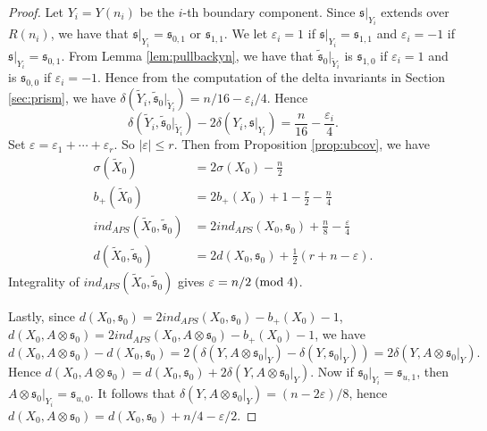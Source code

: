 \documentclass{amsart}
\theoremstyle{definition}
\theoremstyle{remark}
\numberwithin{equation}{section}
\begin{document}
\begin{proof}
Let $Y_i = Y(n_i)$ be the $i$-th boundary component. Since $\mathfrak{s}|_{Y_i}$ extends over $R(n_i)$, we have that $\mathfrak{s}|_{Y_i} = \mathfrak{s}_{0,1}$ or $\mathfrak{s}_{1,1}$. We let $\varepsilon_i = 1$ if $\mathfrak{s}|_{Y_i} = \mathfrak{s}_{1,1}$ and $\varepsilon_i = -1$ if $\mathfrak{s}|_{Y_i} = \mathfrak{s}_{0,1}$. From Lemma \ref{lem:pullbackyn}, we have that $\widetilde{\mathfrak{s}}_0 |_{\widetilde{Y}_i}$ is $\mathfrak{s}_{1,0}$ if $\varepsilon_i = 1$ and is $\mathfrak{s}_{0,0}$ if $\varepsilon_i = -1$. Hence from the computation of the delta invariants in Section \ref{sec:prism}, we have $\delta( \widetilde{Y}_i , \widetilde{\mathfrak{s}}_0 |_{\widetilde{Y}_i}) = n/16 - \varepsilon_i/4$. Hence
\[
\delta( \widetilde{Y}_i , \widetilde{\mathfrak{s}}_0 |_{\widetilde{Y}_i}) - 2\delta(Y_i , \mathfrak{s}|_{Y_i}) = \frac{n}{16} - \frac{\varepsilon_i}{4}.
\]
Set $\varepsilon = \varepsilon_1 + \cdots + \varepsilon_r$. So $|\varepsilon| \le r$. Then from Proposition \ref{prop:ubcov}, we have
\begin{align*}
\sigma(\widetilde{X}_0) &= 2 \sigma(X_0) - \frac{n}{2} \\
b_+(\widetilde{X}_0) &= 2b_+(X_0) + 1 -\frac{r}{2} - \frac{n}{4} \\
ind_{APS}(\widetilde{X}_0 , \widetilde{\mathfrak{s}}_0) &= 2 ind_{APS}(X_0 , \mathfrak{s}_0) + \frac{n}{8} - \frac{\varepsilon}{4} \\
d(\widetilde{X}_0 , \widetilde{\mathfrak{s}}_0) &= 2d(X_0 , \mathfrak{s}_0) + \frac{1}{2}( r+n-\varepsilon).
\end{align*}
Integrality of $ind_{APS}(\widetilde{X}_0 , \widetilde{\mathfrak{s}}_0)$ gives $\varepsilon = n/2 \; ({\rm mod} \; 4)$.

Lastly, since $d(X_0 , \mathfrak{s}_{0}) = 2 ind_{APS}(X_0 , \mathfrak{s}_{0}) - b_+(X_0) - 1$, $d(X_0 , A \otimes \mathfrak{s}_0) = 2ind_{APS}(X_0 , A \otimes \mathfrak{s}_0) - b_+(X_0) - 1$, we have
\[
d(X_0 , A \otimes \mathfrak{s}_0) - d(X_0 , \mathfrak{s}_0) = 2( \delta( Y , A \otimes \mathfrak{s}_0 |_Y ) - \delta( Y , \mathfrak{s}_0 |_Y)) = 2 \delta(Y , A \otimes \mathfrak{s}_0 |_Y).
\]
Hence $d(X_0 , A \otimes \mathfrak{s}_0) = d(X_0 , \mathfrak{s}_0) + 2 \delta(Y , A\otimes \mathfrak{s}_0 |_Y)$. Now if $\mathfrak{s}_0|_{Y_i} = \mathfrak{s}_{u,1}$, then $A \otimes \mathfrak{s}_0 |_{Y_i} = \mathfrak{s}_{u,0}$. It follows that $\delta(Y , A \otimes \mathfrak{s}_0|_Y) = (n - 2 \varepsilon)/8$, hence $d(X_0 , A \otimes \mathfrak{s}_0) = d(X_0 , \mathfrak{s}_0) + n/4 - \varepsilon/2$.
\end{proof}
\end{document}
